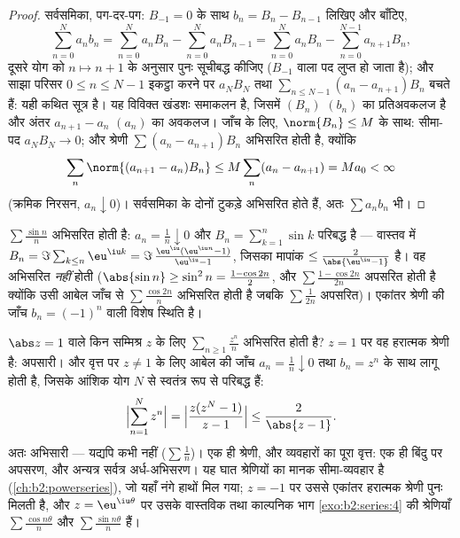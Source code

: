 \begin{proof}
सर्वसमिका, पग-दर-पग: $B_{-1} = 0$ के साथ $b_n = B_n -
B_{n-1}$ लिखिए और बाँटिए,
\[
\sum_{n=0}^{N} a_nb_n
= \sum_{n=0}^{N} a_nB_n - \sum_{n=0}^{N} a_nB_{n-1}
= \sum_{n=0}^{N} a_nB_n - \sum_{n=0}^{N-1} a_{n+1}B_{n} ,
\]
दूसरे योग को $n \mapsto n + 1$ के अनुसार पुनः सूचीबद्ध कीजिए ($B_{-1}$ वाला पद लुप्त हो
जाता है); और साझा परिसर $0 \leq n \leq N-1$ इकट्ठा करने पर $a_NB_N$ तथा $\sum_{n\leq N-1}(a_n - a_{n+1})B_n$ बचते हैं: यही
कथित सूत्र है। यह विविक्त खंडशः समाकलन है, जिसमें $(B_n)$ $(b_n)$ का प्रतिअवकलज
है और अंतर $a_{n+1}
- a_n$ $(a_n)$ का अवकलज। जाँच के लिए, $\norm{B_n}
\leq M$ के साथ: सीमा-पद $a_N B_N \to 0$;
और श्रेणी $\sum (a_n -
a_{n+1})B_n$  अभिसरित होती है, क्योंकि
\[
\sum_n \norm{(a_{n+1} - a_n)B_n} \leq M \sum_n (a_n - a_{n+1})
= M a_0 < \infty
\]
(क्रमिक निरसन, $a_n \downarrow 0$)। सर्वसमिका के दोनों टुकड़े अभिसरित होते हैं, अतः
$\sum a_n b_n$ भी।
\end{proof}

\begin{example}\label{ex:b2:series:sinn}
$\sum \frac{\sin n}{n}$ अभिसरित होती है: $a_n = \frac1n \downarrow 0$ और $B_n = \sum_{k=1}^{n} \sin k$ परिबद्ध है --- वास्तव में $B_n =
\Im\sum_{k \leq n} \eu^{\iu k} = \Im\,\frac{\eu^{\iu}(\eu^{\iu n} -
1)}{\eu^{\iu} - 1}$, जिसका
मापांक $\leq \frac{2}{\abs{\eu^{\iu} - 1}}$ है। वह  अभिसरित \emph{नहीं} होती ($\abs{\sin n} \geq \sin^2 n
= \frac{1 - \cos 2n}{2}$, और $\sum \frac{1 - \cos 2n}{2n}$
अपसरित होती है क्योंकि उसी आबेल जाँच से $\sum \frac{\cos 2n}{n}$ अभिसरित होती है जबकि $\sum \frac{1}{2n}$
अपसरित)। एकांतर श्रेणी की जाँच $b_n = (-1)^n$ वाली विशेष स्थिति है।
\end{example}

\begin{example}[अभिसरण वृत्त पर आबेल]\label{ex:b2:series:abelboundary}
$\abs z = 1$ वाले किन सम्मिश्र $z$ के लिए $\sum_{n \geq 1}
\frac{z^n}{n}$ अभिसरित होती है? $z = 1$ पर वह हरात्मक
श्रेणी है: अपसारी। और वृत्त पर $z \neq 1$ के लिए आबेल की जाँच $a_n = \frac1n \downarrow 0$ तथा $b_n = z^n$ के
साथ लागू होती है, जिसके आंशिक योग $N$ से स्वतंत्र रूप से परिबद्ध हैं:
\[
\Bigl|\sum_{n=1}^{N} z^n\Bigr|
= \Bigl|\frac{z(z^N - 1)}{z - 1}\Bigr|
\leq \frac{2}{\abs{z - 1}} .
\]
अतः अभिसारी --- यद्यपि  कभी नहीं ($\sum\frac1n$)। एक ही श्रेणी,
और व्यवहारों का पूरा वृत्त: एक ही बिंदु पर अपसरण, और अन्यत्र सर्वत्र
अर्ध-अभिसरण। यह घात श्रेणियों का मानक सीमा-व्यवहार है (\cref{ch:b2:powerseries}), जो यहाँ
नंगे हाथों मिल गया; $z = -1$ पर उससे एकांतर हरात्मक श्रेणी पुनः मिलती है,
और $z = \eu^{\iu\theta}$ पर उसके वास्तविक तथा काल्पनिक भाग \cref{exo:b2:series:4} की श्रेणियाँ $\sum\frac{\cos
n\theta}{n}$ और $\sum\frac{\sin n\theta}{n}$
हैं।
\end{example}

